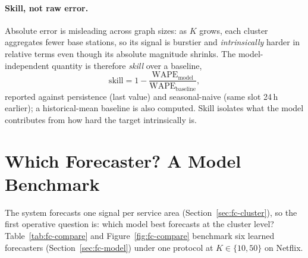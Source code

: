 \paragraph{Skill, not raw error.} Absolute error is misleading across graph sizes: as $K$ grows,
each cluster aggregates fewer base stations, so its signal is burstier and \emph{intrinsically}
harder in relative terms even though its absolute magnitude shrinks. The model-independent quantity
is therefore \emph{skill} over a baseline,
\begin{equation}
  \mathrm{skill} = 1 - \frac{\mathrm{WAPE}_\text{model}}{\mathrm{WAPE}_\text{baseline}},
  \label{eq:skill}
\end{equation}
reported against persistence (last value) and seasonal-naive (same slot 24\,h earlier); a
historical-mean baseline is also computed. Skill isolates what the model contributes from how hard
the target intrinsically is.

\section{Which Forecaster? A Model Benchmark}
\label{sec:comparison}

The system forecasts one signal per service area (Section~\ref{sec:fc-cluster}), so the first operative
question is: which model best forecasts at the cluster level? Table~\ref{tab:fc-compare} and
Figure~\ref{fig:fc-compare} benchmark six learned forecasters (Section~\ref{sec:fc-model}) under one
protocol at $K\in\{10,50\}$ on Netflix.

